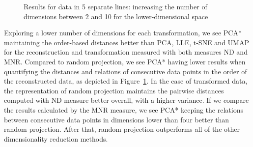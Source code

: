 \documentclass[pdftex,12pt,a4paper]{report}
\begin{document}
\begin{figure}[!htb]
    \caption{Results for data in 5 separate lines: increasing the number of dimensions between 2 and 10 for the lower-dimensional space}\label{fig:avg_dev_dyn_low_seplines_zoom}
\end{figure}

Exploring a lower number of dimensions for each transformation, we see PCA* maintaining the order-based distances better than PCA, LLE, t-SNE and UMAP for the reconstruction and transformation measured with both measures ND and MNR.
Compared to random projection, we see PCA* having lower results when quantifying the distances and relations of consecutive data points in the order of the reconstructed data, as depicted in Figure~\ref{fig:avg_dev_dyn_low_seplines_zoom}.
In the case of transformed data, the representation of random projection maintains the pairwise distances computed with ND measure better overall, with a higher variance.
If we compare the results calculated by the MNR measure, we see PCA* keeping the relations between consecutive data points in dimensions lower than four better than random projection.
After that, random projection outperforms all of the other dimensionality reduction methods.
\end{document}
